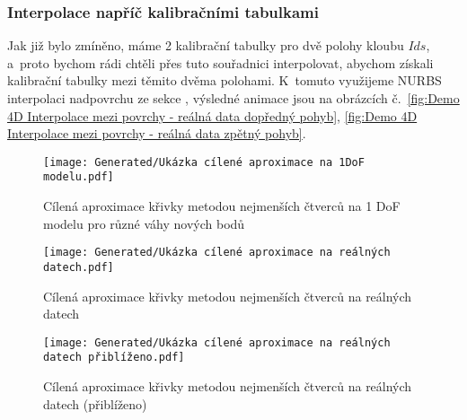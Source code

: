 \subsubsection{Interpolace napříč kalibračními tabulkami}
Jak již bylo zmíněno, máme 2 kalibrační tabulky pro dvě polohy kloubu $Ids$, a~proto bychom rádi chtěli přes tuto souřadnici interpolovat, abychom získali kalibrační tabulky mezi těmito dvěma polohami. K~tomuto využijeme NURBS interpolaci nadpovrchu ze sekce , výsledné animace jsou na obrázcích č.~\ref{fig:Demo 4D Interpolace mezi povrchy - reálná data dopředný pohyb},
\ref{fig:Demo 4D Interpolace mezi povrchy - reálná data zpětný pohyb}.
\begin{figure}[H]
    \centering
    \texttt{[image: Generated/Ukázka cílené aproximace na 1DoF modelu.pdf]}
    \caption{Cílená aproximace křivky metodou nejmenších čtverců na 1 DoF modelu
        pro různé váhy nových bodů}
    \label{fig:Cílená aproximace křivky 1 DoF}
\end{figure}
\begin{imagepage}
    \begin{figure}[H]
        \centering
        \texttt{[image: Generated/Ukázka cílené aproximace na reálných datech.pdf]}
        \caption{Cílená aproximace křivky metodou nejmenších čtverců na reálných datech}
        \label{fig:Cílená aproximace křivky}
    \end{figure}
    \begin{figure}[H]
        \centering
        \texttt{[image: Generated/Ukázka cílené aproximace na reálných datech přiblíženo.pdf]}
        \caption{Cílená aproximace křivky metodou nejmenších čtverců na reálných datech (přiblíženo)}
        \label{fig:Cílená aproximace křivky přiblíženo}
    \end{figure}
\end{imagepage}

